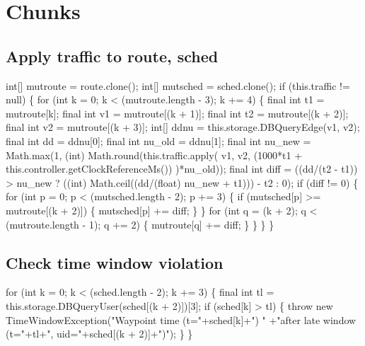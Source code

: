 \section{Chunks}

\subsection{Apply traffic to route, sched}
\nwenddocs{}\endmoddef{}
int[] mutroute = route.clone();
int[] mutsched = sched.clone();
if (this.traffic != null) \{
  for (int k = 0; k < (mutroute.length - 3); k += 4) \{
    final int t1 = mutroute[k];
    final int v1 = mutroute[(k + 1)];
    final int t2 = mutroute[(k + 2)];
    final int v2 = mutroute[(k + 3)];
    int[] ddnu = this.storage.DBQueryEdge(v1, v2);
    final int dd = ddnu[0];
    final int nu_old = ddnu[1];
    final int nu_new = Math.max(1, 
        (int) Math.round(this.traffic.apply(
            v1, v2, (1000*t1 + this.controller.getClockReferenceMs())
        )*nu_old));
    final int diff = ((dd/(t2 - t1)) > nu_new
        ? ((int) Math.ceil((dd/(float) nu_new + t1))) - t2
        : 0);
    if (diff != 0) \{
      for (int p = 0; p < (mutsched.length - 2); p += 3) \{
        if (mutsched[p] >= mutroute[(k + 2)]) \{
          mutsched[p] += diff;
        \}
      \}
      for (int q = (k + 2); q < (mutroute.length - 1); q += 2) \{
        mutroute[q] += diff;
      \}
    \}
  \}
\}
\nwendcode{}\nwdocspar

\subsection{Check time window violation}
\nwenddocs{}\endmoddef{}
for (int k = 0; k < (sched.length - 2); k += 3) \{
  final int tl = this.storage.DBQueryUser(sched[(k + 2)])[3];
  if (sched[k] > tl) \{
    throw new TimeWindowException("Waypoint time (t="+sched[k]+") "
        +"after late window (t="+tl+", uid="+sched[(k + 2)]+")");
  \}
\}
\nwendcode{}\nwdocspar

